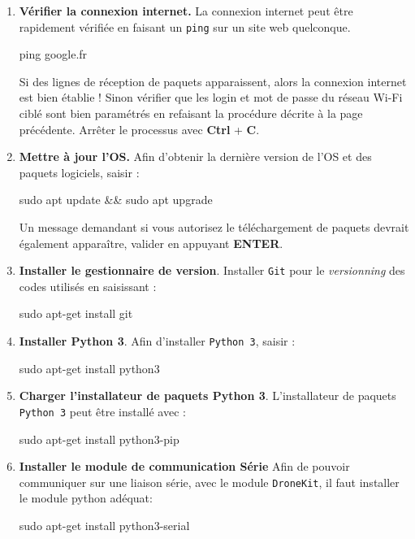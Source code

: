 \documentclass[a4paper, 10pt]{article}
\begin{document}
\begin{enumerate}
	\item\textbf{Vérifier la connexion internet.} La connexion internet 
	peut être rapidement vérifiée en faisant un \texttt{ping} sur un
	site web quelconque.
	
\begin{commandshell}
ping google.fr
\end{commandshell}

	Si des lignes de réception de paquets apparaissent, alors la
	connexion internet est bien établie ! Sinon vérifier que les
	login et mot de passe du réseau Wi-Fi ciblé sont bien paramétrés
	en refaisant la procédure décrite à la page précédente.	
	Arrêter le processus avec \textbf{Ctrl} + \textbf{C}.
	
	\item\textbf{Mettre à jour l'OS.} Afin d'obtenir la dernière version
	de l'OS et des paquets logiciels, saisir :
	
\begin{commandshell}
sudo apt update && sudo apt upgrade
\end{commandshell}
	
	Un message demandant si vous autorisez le téléchargement de paquets
	devrait également apparaître, valider en appuyant \textbf{ENTER}.
	
	\item\textbf{Installer le gestionnaire de version}. Installer \texttt{Git} pour le 
	\textit{versionning} des codes utilisés en saisissant :
	
\begin{commandshell}
sudo apt-get install git
\end{commandshell}	
	
	\item\textbf{Installer Python 3}. Afin d'installer \texttt{Python 3},
	saisir :
	
\begin{commandshell}
sudo apt-get install python3
\end{commandshell}

	\item\textbf{Charger l'installateur de paquets Python 3}. 
	L'installateur de paquets \texttt{Python 3} peut être installé avec :
	
\begin{commandshell}
sudo apt-get install python3-pip
\end{commandshell}
  	\item\textbf{Installer le module de communication Série}
  	Afin de pouvoir communiquer sur une liaison série, avec le module \texttt{DroneKit},
  	il faut installer le module python adéquat:
  	\begin{commandshell}
sudo apt-get install python3-serial
\end{commandshell}


\end{enumerate}
\end{document}

